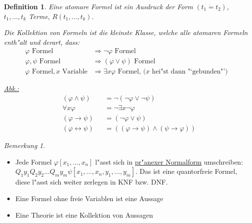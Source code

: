 \documentclass[a4paper,12pt,numbers=noenddot,parskip=full]{scrartcl}
\theoremstyle{dotless}
\newtheorem{definition}[theorem]{Definition}
\theoremstyle{remark}
\newtheorem*{remark}{Bemerkung}
\begin{document}
\begin{definition}
	Eine atomare Formel ist ein Ausdruck der Form $(t_1 \dot= t_2)$, $t_1, \dots, t_k$ Terme, $R(t_1, \dots, t_k)$.
	
	Die Kollektion von Formeln ist die kleinste Klasse, welche alle atomaren Formeln enth"alt und derart, dass:
	\begin{align*}
		\varphi \text{ Formel} &\Longrightarrow \lnot \varphi \text{ Formel}\\
		\varphi, \psi \text{ Formel} &\Longrightarrow (\varphi \lor \psi) \text{ Formel}\\
		\varphi \text{ Formel}, x \text{ Variable} &\Longrightarrow \exists x \varphi \text{ Formel, ($x$ hei"st dann "`gebunden"')}
	\end{align*}
	
	\underline{Abk.:} \begin{align*}
		&(\varphi \land \psi) &&= \lnot(\lnot\varphi\lor\lnot\psi)\\
		&\forall x \varphi &&= \lnot \exists x \lnot \varphi\\
		&(\varphi \rightarrow \psi) &&= (\lnot \varphi \lor \psi)\\
		&(\varphi \leftrightarrow \psi) &&= ((\varphi \rightarrow \psi) \land (\psi \rightarrow \varphi))
	\end{align*}
\end{definition}

\begin{remark}
	
	\begin{itemize}
		\item Jede Formel $\varphi [x_1, \dots, x_n]$ l"asst sich in \underline{pr"anexer Normalform} umschreiben:	
		$Q_1 y_1 Q_2 y_2 \dots Q_m y_m \psi [x_1, \dots, x_n, y_1, \dots, y_m]$. Das ist eine quantorfreie Formel, diese l"asst sich weiter zerlegen in KNF bzw. DNF.
		\item Eine Formel ohne freie Variablen ist eine Aussage
		\item Eine Theorie ist eine Kollektion von Aussagen
	\end{itemize}
\end{remark}
\end{document}
